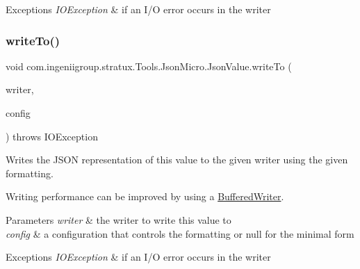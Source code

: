\begin{DoxyExceptions}{Exceptions}
{\em I\+O\+Exception} & if an I/O error occurs in the writer \\
\hline
\end{DoxyExceptions}
\mbox{\label{classcom_1_1ingeniigroup_1_1stratux_1_1_tools_1_1_json_micro_1_1_json_value_a9293ecb42f9bf14d6c5df006685df49e}} 
\subsubsection{\texorpdfstring{write\+To()}{writeTo()}\hspace{0.1cm}{\footnotesize\ttfamily [2/2]}}
{\footnotesize\ttfamily void com.\+ingeniigroup.\+stratux.\+Tools.\+Json\+Micro.\+Json\+Value.\+write\+To (\begin{DoxyParamCaption}\item[{Writer}]{writer,  }\item[{\hyperlink{classcom_1_1ingeniigroup_1_1stratux_1_1_tools_1_1_json_micro_1_1_writer_config}{Writer\+Config}}]{config }\end{DoxyParamCaption}) throws I\+O\+Exception}

Writes the J\+S\+ON representation of this value to the given writer using the given formatting. 

Writing performance can be improved by using a \hyperlink{}{Buffered\+Writer}. 


\begin{DoxyParams}{Parameters}
{\em writer} & the writer to write this value to \\
\hline
{\em config} & a configuration that controls the formatting or {\ttfamily null} for the minimal form \\
\hline
\end{DoxyParams}

\begin{DoxyExceptions}{Exceptions}
{\em I\+O\+Exception} & if an I/O error occurs in the writer \\
\hline
\end{DoxyExceptions}


